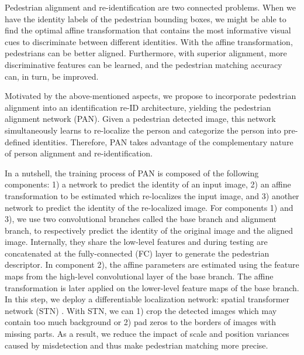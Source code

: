 Pedestrian alignment and re-identification are two connected problems. When we have the identity labels of the pedestrian bounding boxes, we might be able to find the optimal affine transformation that contains the most informative visual cues to discriminate between different identities. With the affine transformation, pedestrians can be better aligned. Furthermore, with superior alignment, more discriminative features can be learned, and the pedestrian matching accuracy can, in turn, be improved.

Motivated by the above-mentioned aspects, we propose to incorporate pedestrian alignment into an identification re-ID architecture, yielding the pedestrian alignment network (PAN). Given a pedestrian detected image, this network simultaneously learns to re-localize the person and categorize the person into pre-defined identities. Therefore, PAN takes advantage of the complementary nature of person alignment and re-identification. 

In a nutshell, the training process of PAN is composed of the following components: 1) a network to predict the identity of an input image, 2) an affine transformation to be estimated which re-localizes the input image, and 3) another network to predict the identity of the re-localized image. For components 1) and 3), we use two convolutional branches called the base branch and alignment branch, to respectively predict the identity of the original image and the aligned image. Internally, they share the low-level features and during testing are concatenated at the fully-connected (FC) layer to generate the pedestrian descriptor. In component 2), the affine parameters are estimated using the feature maps from the high-level convolutional layer of the base branch. The affine transformation is later applied on the lower-level feature maps of the base branch. In this step, we deploy a differentiable localization network: spatial transformer network (STN) \cite{jaderberg2015spatial}. With STN, we can 1) crop the detected images which may contain too much background or 2) pad zeros to the borders of images with missing parts. As a result, we reduce the impact of scale and position variances caused by misdetection and thus make pedestrian matching more precise. 

